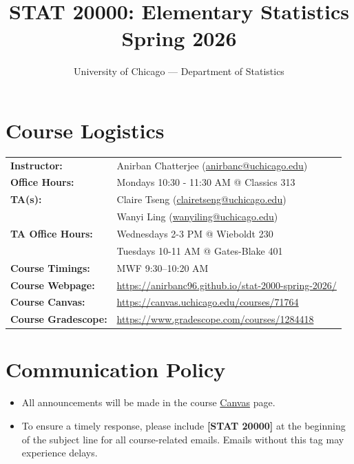 \documentclass[11pt]{article}
\title{\textbf{STAT 20000: Elementary Statistics} \\ \large Spring 2026}
\author{University of Chicago --- Department of Statistics}
\date{}
\begin{document}
\maketitle

\section*{Course Logistics}
\begin{tabular}{ll}
    \textbf{Instructor:} & Anirban Chatterjee (\href{mailto:anirbanc@uchicago.edu}{anirbanc@uchicago.edu}) \\
    \textbf{Office Hours:} & Mondays 10:30 - 11:30 AM @ Classics 313\\
    \textbf{TA(s):} & Claire Tseng (\href{mailto:clairetseng@uchicago.edu}{clairetseng@uchicago.edu}) \\ & Wanyi Ling (\href{mailto:wanyiling@uchicago.edu}{wanyiling@uchicago.edu})\\
    \textbf{TA Office Hours:} &  Wednesdays 2-3 PM @ Wieboldt 230 \\ & Tuesdays 10-11 AM @ Gates-Blake 401\\
    \textbf{Course Timings:} & MWF 9:30--10:20 AM \\
    \textbf{Course Webpage:} & \url{https://anirbanc96.github.io/stat-2000-spring-2026/}\\
    \textbf{Course Canvas:} & \url{https://canvas.uchicago.edu/courses/71764}\\
    \textbf{Course Gradescope:} & \url{https://www.gradescope.com/courses/1284418}
\end{tabular}

\section{Communication Policy}
\begin{itemize}
    \item All announcements will be made in the course \href{https://canvas.uchicago.edu/courses/71764}{Canvas} page.
    \item To ensure a timely response, please include \textbf{[STAT 20000]} at the beginning of the subject line for all course-related emails. Emails without this tag may experience delays.
\end{itemize}
\end{document}
